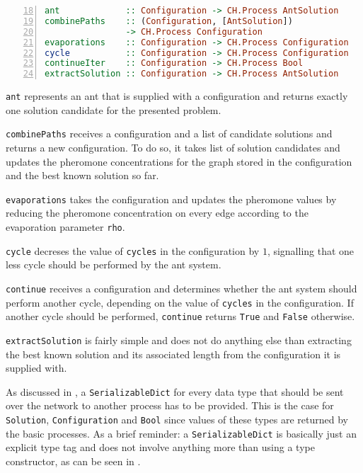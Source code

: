 \begin{lstlisting}[language=Haskell,frame=tb,numbers=left,label=lst:ant_basic,caption=Signatures of basic processes.,firstnumber=18]
ant             :: Configuration -> CH.Process AntSolution
combinePaths    :: (Configuration, [AntSolution])
                -> CH.Process Configuration
evaporations    :: Configuration -> CH.Process Configuration
cycle           :: Configuration -> CH.Process Configuration
continueIter    :: Configuration -> CH.Process Bool
extractSolution :: Configuration -> CH.Process AntSolution
\end{lstlisting}

\texttt{ant} represents an ant that is supplied with a configuration and returns exactly one solution candidate for the presented problem.

\texttt{combinePaths} receives a configuration and a list of candidate solutions and returns a new configuration. To do so, it takes list of solution candidates and updates the pheromone concentrations for the graph stored in the configuration and the best known solution so far.

\texttt{evaporations} takes the configuration and updates the pheromone values by reducing the pheromone concentration on every edge according to the evaporation parameter \texttt{rho}.

\texttt{cycle} decreses the value of \texttt{cycles} in the configuration by $1$, signalling that one less cycle should be performed by the ant system.

\texttt{continue} receives a configuration and determines whether the ant system should perform another cycle, depending on the value of \texttt{cycles} in the configuration. If another cycle should be performed, \texttt{continue} returns \texttt{True} and \texttt{False} otherwise.

\texttt{extractSolution} is fairly simple and does not do anything else than extracting the best known solution and its associated length from the configuration it is supplied with.

As discussed in , a \texttt{SerializableDict} for every data type that should be sent over the network to another process has to be provided. This is the case for \texttt{Solution}, \texttt{Configuration} and \texttt{Bool} since values of these types are returned by the basic processes. As a brief reminder: a \texttt{SerializableDict} is basically just an explicit type tag and does not involve anything more than using a type constructor, as can be seen in .

